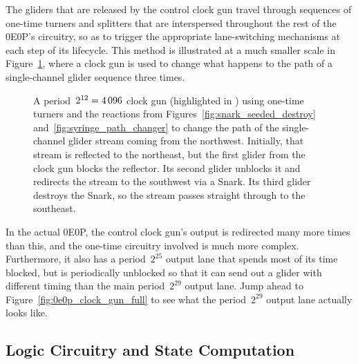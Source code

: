 The gliders that are released by the control clock gun travel through sequences of one-time turners and splitters that are interspersed throughout the rest of the 0E0P's circuitry, so as to trigger the appropriate lane-switching mechanisms at each step of its lifecycle. This method is illustrated at a much smaller scale in Figure~\ref{fig:clock_path_switcher}, where a clock gun is used to change what happens to the path of a single-channel glider sequence three times.

\begin{figure}[!htb]
	\centering
	\caption{A period~$2^{12} = 4{\,}096$ clock gun (highlighted in ) using one-time turners and the reactions from Figures~\ref{fig:snark_seeded_destroy} and~\ref{fig:syringe_path_changer} to change the path of the single-channel glider stream coming from the northwest. Initially, that stream is reflected to the northeast, but the first glider from the clock gun blocks the reflector. Its second glider unblocks it and redirects the stream to the southwest via a Snark. Its third glider destroys the Snark, so the stream passes straight through to the southeast.}\label{fig:clock_path_switcher}
\end{figure}

In the actual 0E0P, the control clock gun's output is redirected many more times than this, and the one-time circuitry involved is much more complex. Furthermore, it also has a period~$2^{25}$ output lane that spends most of its time blocked, but is periodically unblocked so that it can send out a glider with different timing than the main period~$2^{29}$ output lane. Jump ahead to Figure~\ref{fig:0e0p_clock_gun_full} to see what the period~$2^{29}$ output lane actually looks like.


\subsection{Logic Circuitry and State Computation}\label{sec:0e0p_structure_logic}

